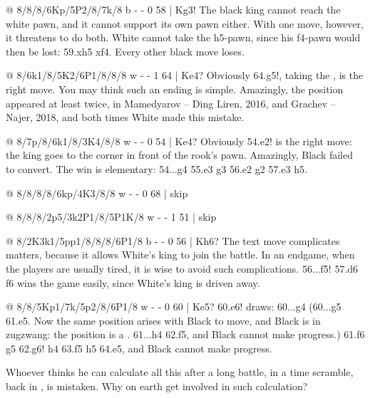 @ 8/8/8/6Kp/5P2/8/7k/8 b - - 0 58 | Kg3!
The black king cannot reach the white pawn, and it cannot support its own pawn either. With one
move, however, it threatens to do both. White cannot take the h5-pawn, since his f4-pawn would
then be lost: 59.\K xh5 \K xf4. Every other black move loses.

@ 8/6k1/8/5K2/6P1/8/8/8 w - - 1 64 | Ke4?
Obviously 64.\K g5!, taking the , is the right
move. You may think such an ending is simple. Amazingly, the position appeared at least twice, in
Mamedyarov -- Ding Liren, 2016, and Grachev -- Najer, 2018, and both times White made this mistake.

@ 8/7p/8/6k1/8/3K4/8/8 w - - 0 54 | Ke4?
Obviously 54.\K e2! is the right move: the king goes to the corner in front of the rook's pawn.
Amazingly, Black failed to convert. The win is elementary: 54...\K g4 55.\K e3 \K g3 56.\K e2 \K g2
57.\K e3 h5.

@ 8/8/8/8/6kp/4K3/8/8 w - - 0 68 | skip

@ 8/8/8/2p5/3k2P1/8/5P1K/8 w - - 1 51 | skip

@ 8/2K3k1/5pp1/8/8/8/6P1/8 b - - 0 56 | Kh6?
The text move complicates matters, because it allows White's king to join the battle. In an
endgame, when the players are usually tired, it is wise to avoid such complications. 56...f5!
57.\K d6 \K f6 wins the game easily, since White's king is driven away.

@ 8/8/5Kp1/7k/5p2/8/6P1/8 w - - 0 60 | Ke5?
60.\K e6! draws: 60...\K g4 (60...g5 61.\K e5. Now the same position arises with Black to move, and
Black is in zugzwang: the position is a .
61...\K h4 62.\K f5, and Black cannot make progress.) 61.\K f6 g5 62.\K g6! \K h4 63.\K f5 \K h5
64.\K e5, and Black cannot make progress.

Whoever thinks he can calculate all this after a long battle, in a time scramble, back in
, is mistaken. Why on earth get involved in such calculation?

